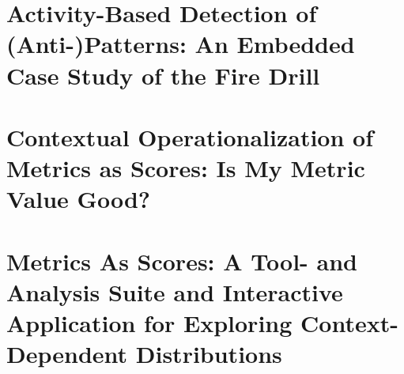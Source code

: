 \begin{appendices}
\renewcommand{\appendixname}{Article}
\chapter{Activity-Based Detection of (Anti-)Patterns: An Embedded Case Study of the Fire Drill}\label{app:publ-honel2023embedded}
\chaptermark{\label{app:publ-honel2023embedded}}





\renewcommand{\appendixname}{Paper}
\chapter{Contextual Operationalization of Metrics as Scores: Is My Metric Value Good?}\label{app:publ-honel2022qrsmas}
\chaptermark{\label{app:publ-honel2022qrsmas}}





\renewcommand{\appendixname}{Article}
\chapter{Metrics As Scores: A Tool- and Analysis Suite and Interactive Application for Exploring Context-Dependent Distributions}\label{app:publ-honel2023masjoss}
\chaptermark{\label{app:publ-honel2023masjoss}}






\end{appendices}
